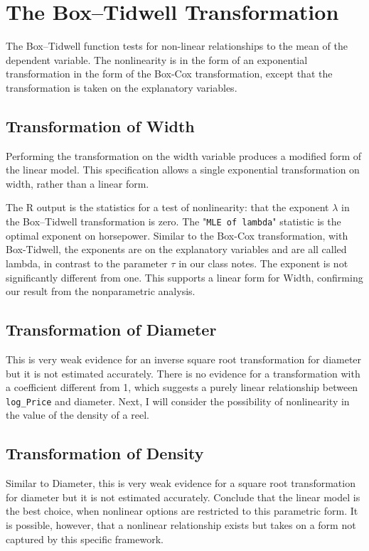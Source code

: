 \documentclass[11pt]{paper}
\begin{document}
\section{The Box--Tidwell Transformation}

The Box--Tidwell function tests for non-linear relationships
to the mean of the dependent variable.
The nonlinearity is in the form of an
exponential transformation in the form of the Box-Cox
transformation, except that the transformation is taken
on the explanatory variables.


\subsection{Transformation of Width}


Performing the transformation on the 
width variable
produces a modified form of the linear model.
This specification allows a single exponential
transformation on 
width, 
rather than a linear form.



The \textsf{R} output is the statistics for a test of nonlinearity:
that the exponent $\lambda$ in the Box--Tidwell transformation is zero.
%
The "\texttt{MLE of lambda}" statistic is the optimal exponent on horsepower.
Similar to the Box-Cox transformation,
with Box-Tidwell, the exponents are on the explanatory variables
and are all called lambda, in contrast
to the parameter $\tau$ in our class notes.
%  
The exponent is not significantly different from one. 
This supports a linear form for Width,
confirming our result from the nonparametric analysis.



\subsection{Transformation of Diameter}





This is very weak evidence for
an inverse square root transformation
for diameter but it is not estimated accurately.
%
There is no evidence for a transformation 
with a coefficient different from 1, 
which suggests
a purely linear relationship between \texttt{log\_Price}
and 
diameter.
Next, I will consider the possibility of nonlinearity 
in the value of the density of a reel. 

\subsection{Transformation of Density}




Similar to Diameter, this is very weak evidence for
a square root transformation
for diameter but it is not estimated accurately.
%
Conclude that the linear model is the best choice, 
when nonlinear options are restricted to this parametric form.
It is possible, however, that a nonlinear relationship exists
but takes on a form not captured by this specific framework. 





\end{document}
